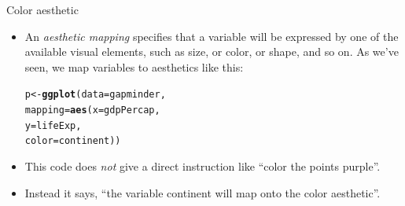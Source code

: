 \documentclass[10pt]{beamer}\usepackage[]{graphicx}\usepackage[]{color}
\makeatletter
\newcommand{\hlstd}[1]{\textcolor[rgb]{0.345,0.345,0.345}{#1}}%
\newcommand{\hlkwb}[1]{\textcolor[rgb]{0.69,0.353,0.396}{#1}}%
\newcommand{\hlkwc}[1]{\textcolor[rgb]{0.333,0.667,0.333}{#1}}%
\newcommand{\hlkwd}[1]{\textcolor[rgb]{0.737,0.353,0.396}{\textbf{#1}}}%
\newenvironment{kframe}{%
 \def\at@end@of@kframe{}%
 \ifinner\ifhmode%
  \def\at@end@of@kframe{\end{minipage}}%
  \begin{minipage}{\columnwidth}%
 \fi\fi%
 \def\FrameCommand##1{\hskip\@totalleftmargin \hskip-\fboxsep
 \colorbox{shadecolor}{##1}\hskip-\fboxsep
     \hskip-\linewidth \hskip-\@totalleftmargin \hskip\columnwidth}%
 \MakeFramed {\advance\hsize-\width
   \@totalleftmargin\z@ \linewidth\hsize
   \@setminipage}}%
 {\par\unskip\endMakeFramed%
 \at@end@of@kframe}
\newenvironment{knitrout}{}{} %
\makeatother
\begin{document}
\begin{frame}[fragile]{Color aesthetic}
\begin{itemize}
	\item An \textit{aesthetic mapping} specifies that a variable will be expressed by one of the available visual elements, such as size, or color, or shape, and so on. As we've seen, we map variables to aesthetics like this: 
\begin{knitrout}
\color{fgcolor}\begin{kframe}
\begin{alltt}
\hlstd{p} \hlkwb{<-}  \hlkwd{ggplot}\hlstd{(}\hlkwc{data} \hlstd{= gapminder,}
                \hlkwc{mapping} \hlstd{=} \hlkwd{aes}\hlstd{(}\hlkwc{x} \hlstd{= gdpPercap,}
                                \hlkwc{y} \hlstd{= lifeExp,}
                                \hlkwc{color} \hlstd{= continent))}
\end{alltt}
\end{kframe}
\end{knitrout}
	\pause
	\item This code does \textit{not} give a direct instruction like ``color the points purple''. \pause
	\item Instead it says, ``the variable continent will map onto the color aesthetic''. 
\end{itemize}
	
\end{frame}
\end{document}
